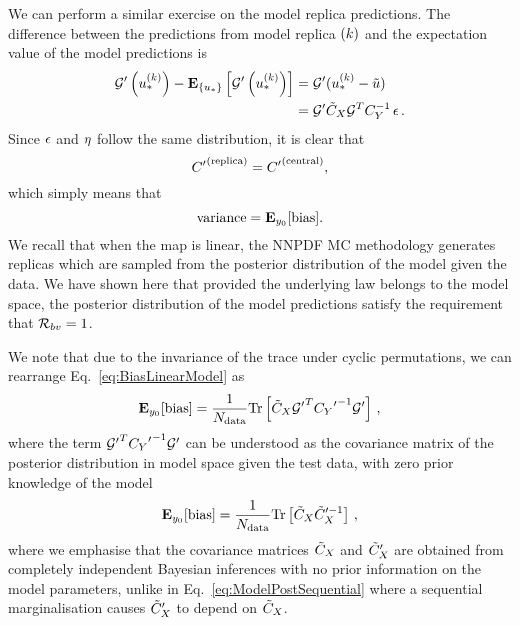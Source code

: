 We can perform a similar exercise on the model replica predictions. The
difference between the predictions from model replica $(k)$ and the
expectation value of the model predictions is
\begin{equation}
    \begin{split}
        {{\mathcal{G}}^{\prime}}\left(u_*^{(k)}\right) -
        \mathbf{E}_{\{ u_* \}} \left[ {{\mathcal{G}}^{\prime}}\left(u_*^{(k)}\right) \right] &=
        {{\mathcal{G}}^{\prime}} (u_*^{(k)} - \tilde{u}) \\
        &= {{\mathcal{G}}^{\prime}} \tilde{C}_X \mathcal{G}^T C_{Y}^{-1} \, \epsilon \, .
    \end{split}
\end{equation}
Since $\epsilon$ and $\eta$ follow the same distribution, it is clear that
\begin{equation}
    {{C}^{\prime}}^{(\rm replica)} = {{C}^{\prime}}^{(\rm central)},
\end{equation}
which simply means that
\begin{equation}
    {\rm variance} = \mathbf{E}_{y_0}[{\rm bias}].
\end{equation}
We recall that when the map is linear, the NNPDF MC methodology generates
replicas which are sampled from the posterior distribution of the model given
the data. We have shown here that provided the underlying law belongs to the
model space, the posterior distribution of the model predictions satisfy the
requirement that $\mathcal{R}_{bv} = 1$.

We note that due to the invariance of the trace under cyclic permutations, we
can rearrange Eq.~\ref{eq:BiasLinearModel} as
\begin{equation}
    \mathbf{E}_{y_0}[{\rm bias}] = \frac{1}{N_{\rm data}}
    {\rm Tr} \left[
        \tilde{C}_X
        {{\mathcal{G}}^{\prime}}^T {{C_{Y}}^{\prime}}^{-1} {{\mathcal{G}}^{\prime}}
    \right] \, ,
\end{equation}
where the term ${{\mathcal{G}}^{\prime}}^T {{C_{Y}}^{\prime}}^{-1}
{{\mathcal{G}}^{\prime}}$ can be understood as the covariance matrix of the posterior
distribution in model space given the test data, with zero prior knowledge of
the model \viz
\begin{equation}\label{eq:BiasTraceModelPost}
    \mathbf{E}_{y_0}[{\rm bias}] = \frac{1}{N_{\rm data}}
    {\rm Tr} \left[ \tilde{C}_X {\tilde{C}_X}^{ \prime -1} \right] \, ,
\end{equation}
where we emphasise that the covariance matrices $\tilde{C}_X$ and
${{\tilde{C}_X}^{\prime}}$ are obtained from completely independent Bayesian
inferences with no prior information on the model parameters, unlike in
Eq.~\ref{eq:ModelPostSequential} where a sequential marginalisation causes
${{\tilde{C}_X}^{\prime}}$ to depend on $\tilde{C}_X$.


